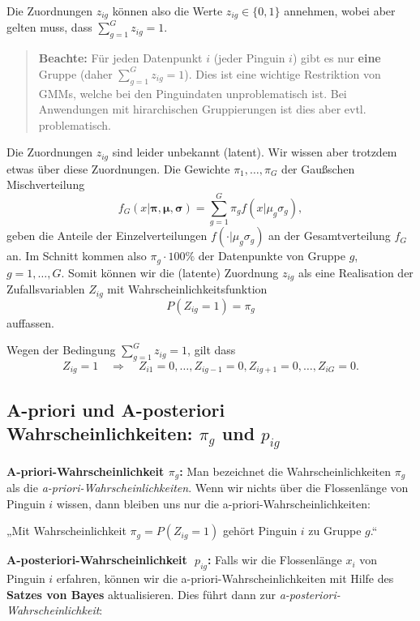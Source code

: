\documentclass[
  ngerman,
]{book}
\begin{document}
Die Zuordnungen \(z_{ig}\) können also die Werte \(z_{ig}\in\{0,1\}\) annehmen, wobei aber gelten muss, dass \(\sum_{g=1}^Gz_{ig}=1\).

\begin{quote}
\textbf{Beachte:} Für jeden Datenpunkt \(i\) (jeder Pinguin \(i\)) gibt es nur \textbf{eine} Gruppe (daher \(\sum_{g=1}^Gz_{ig}=1\)). Dies ist eine wichtige Restriktion von GMMs, welche bei den Pinguindaten unproblematisch ist. Bei Anwendungen mit hirarchischen Gruppierungen ist dies aber evtl. problematisch.
\end{quote}

Die Zuordnungen \(z_{ig}\) sind leider unbekannt (latent). Wir wissen aber trotzdem etwas über diese Zuordnungen. Die Gewichte \(\pi_1,\dots,\pi_G\) der Gaußschen Mischverteilung
\[
f_G(x|\boldsymbol{\pi},\boldsymbol{\mu},\boldsymbol{\sigma})=\sum_{g=1}^G\pi_gf(x|\mu_g\sigma_g),
\]
geben die Anteile der Einzelverteilungen \(f(\cdot|\mu_g\sigma_g)\) an der Gesamtverteilung \(f_G\) an. Im Schnitt kommen also \(\pi_g\cdot 100\%\) der Datenpunkte von Gruppe \(g\), \(g=1,\dots,G\). Somit können wir die (latente) Zuordnung \(z_{ig}\) als eine Realisation der Zufallsvariablen \(Z_{ig}\) mit Wahrscheinlichkeitsfunktion
\[
P(Z_{ig}=1)=\pi_g
\]
auffassen.

Wegen der Bedingung \(\sum_{g=1}^Gz_{ig}=1\), gilt dass
\[
Z_{ig}=1\quad \Rightarrow\quad Z_{i1}=0,\dots,Z_{ig-1}=0,Z_{ig+1}=0,\dots,Z_{iG}=0.
\]

\hypertarget{a-priori-und-a-posteriori-wahrscheinlichkeiten-pi_g-und-p_ig}{%
\subsection{\texorpdfstring{A-priori und A-posteriori Wahrscheinlichkeiten: \(\pi_g\) und \(p_{ig}\)}{A-priori und A-posteriori Wahrscheinlichkeiten: \textbackslash pi\_g und p\_\{ig\}}}\label{a-priori-und-a-posteriori-wahrscheinlichkeiten-pi_g-und-p_ig}}

\textbf{A-priori-Wahrscheinlichkeit \(\pi_g\):} Man bezeichnet die Wahrscheinlichkeiten \(\pi_g\) als die \emph{a-priori-Wahrscheinlichkeiten}. Wenn wir nichts über die Flossenlänge von Pinguin \(i\) wissen, dann bleiben uns nur die a-priori-Wahrscheinlichkeiten:

„Mit Wahrscheinlichkeit \(\pi_g=P(Z_{ig}=1)\) gehört Pinguin \(i\) zu Gruppe \(g\).``

\textbf{A-posteriori-Wahrscheinlichkeit \(\;p_{ig}\):} Falls wir die Flossenlänge \(x_i\) von Pinguin \(i\) erfahren, können wir die a-priori-Wahrscheinlichkeiten mit Hilfe des \textbf{Satzes von Bayes} aktualisieren. Dies führt dann zur \emph{a-posteriori-Wahrscheinlichkeit}:
\end{document}

